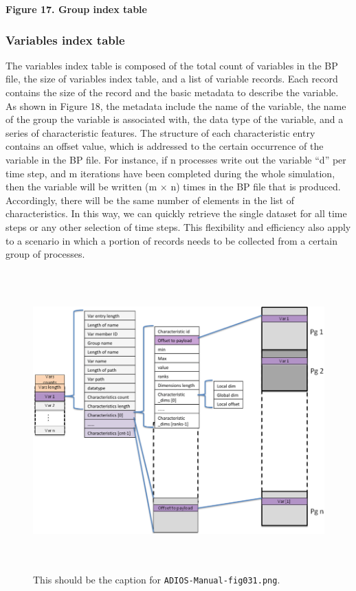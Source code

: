 \begin{center}
{\color{color20} \textbf{Figure 17. Group index table}}
\end{center}

\subsubsection{Variables index table}

The variables index table is composed of the total count of variables in the BP 
file, the size of variables index table, and a list of variable records. Each record 
contains the size of the record and the basic metadata to describe the variable. 
As shown in Figure 18, the metadata include the name of the variable, the name 
of the group the variable is associated with, the data type of the variable, and 
a series of characteristic features. The structure of each characteristic entry 
contains an offset value, which is addressed to the certain occurrence of the variable 
in the BP file. For instance, if n processes write out the variable ``d'' per time 
step, and m iterations have been completed during the whole simulation, then the 
variable will be written (m\textit{ }\ensuremath{\times} n) times in the BP file 
that is produced. Accordingly, there will be the same number of elements in the 
list of characteristics. In this way, we can quickly retrieve the single dataset 
for all time steps or any other selection of time steps. This flexibility and efficiency 
also apply to a scenario in which a portion of records needs to be collected from 
a certain group of processes. 

\begin{figure}[htbp]
\begin{center}
\includegraphics[width=420pt, height=327pt]{ADIOS-Manual-fig031.png}
\caption{This should be the caption for \texttt{ADIOS-Manual-fig031.png}.}
\end{center}
\end{figure}\label{HRef119578880}\label{HToc144350177}


